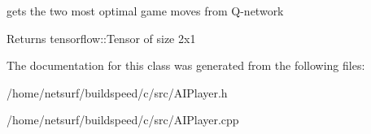 gets the two most optimal game moves from Q-\/network 

\begin{DoxyReturn}{Returns}
tensorflow\+::\+Tensor of size 2x1 
\end{DoxyReturn}


The documentation for this class was generated from the following files\+:\begin{DoxyCompactItemize}
\item 
/home/netsurf/buildspeed/c/src/A\+I\+Player.\+h\item 
/home/netsurf/buildspeed/c/src/A\+I\+Player.\+cpp\end{DoxyCompactItemize}
